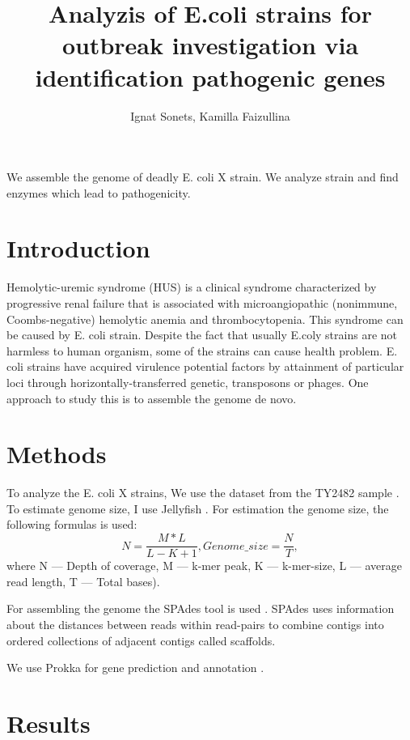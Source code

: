 \documentclass{article}
\title{ Analyzis of E.coli strains for outbreak investigation via identification pathogenic genes    }
\author{ Ignat Sonets, Kamilla Faizullina}
\date{\empty}
\begin{document}
\maketitle
We assemble the genome of deadly E. coli X strain. We analyze strain and find enzymes which lead to pathogenicity.
 
 
\section{Introduction}
Hemolytic-uremic syndrome (HUS) is a clinical syndrome characterized by progressive renal failure that is associated with microangiopathic (nonimmune, Coombs-negative) hemolytic anemia and thrombocytopenia. This syndrome can be caused by  E. coli strain. Despite the fact that usually E.coly strains are not harmless to human organism, some of the strains can cause health problem.  E. coli strains have acquired virulence potential factors by attainment of particular loci through horizontally-transferred genetic, transposons or phages. One approach  to study this is to assemble the genome de novo. 
 

\section{Methods}
To analyze the E. coli X strains, We use the dataset from the TY2482 sample \cite{data}. To estimate genome size, I use Jellyfish \cite{jellyfish}. For estimation the genome size, the following formulas is used: 
$$ N = \frac{M*L}{L-K+1}, Genome\_size = \frac{N}{T}, $$
where N --- Depth of coverage, M --- k-mer peak, K --- k-mer-size, L --- average read length, T --- Total bases).

For assembling the genome the SPAdes tool is used \cite {spades}. SPAdes uses information about the distances between reads within read-pairs to combine contigs into ordered collections of adjacent contigs called scaffolds. 

We use Prokka  for gene prediction and annotation \cite{prokka}.


\section{Results}
\end{document}
